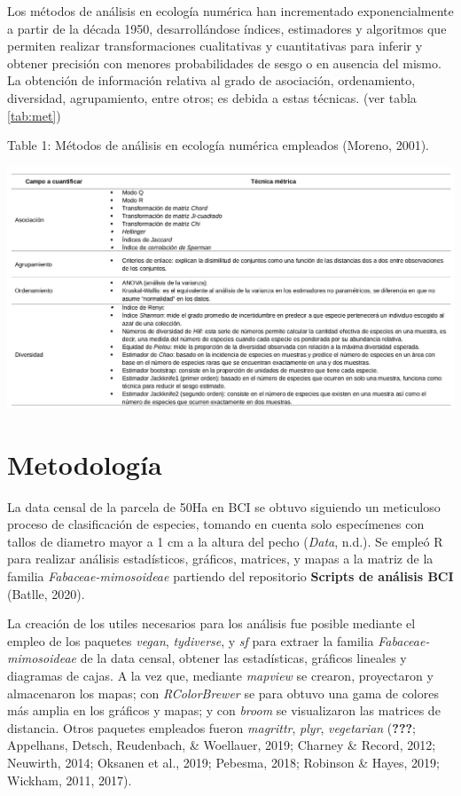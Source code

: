 \documentclass[11pt,]{article}
\begin{document}
Los métodos de análisis en ecología numérica han incrementado
exponencialmente a partir de la década 1950, desarrollándose índices,
estimadores y algoritmos que permiten realizar transformaciones
cualitativas y cuantitativas para inferir y obtener precisión con
menores probabilidades de sesgo o en ausencia del mismo. La obtención de
información relativa al grado de asociación, ordenamiento, diversidad,
agrupamiento, entre otros; es debida a estas técnicas. (ver tabla
\ref {tab:met})

Table 1: Métodos de análisis en ecología numérica empleados (Moreno,
2001).\label{tab:met}

\includegraphics[width=1.00000\textwidth]{Analisis/Diversidad/Tabla_Metodos_Analisis.png}
\textbar{}

\section{Metodología}\label{metodologuxeda}

La data censal de la parcela de 50Ha en BCI se obtuvo siguiendo un
meticuloso proceso de clasificación de especies, tomando en cuenta solo
especímenes con tallos de diametro mayor a 1 cm a la altura del pecho
(\emph{Data}, n.d.). Se empleó R para realizar análisis estadísticos,
gráficos, matrices, y mapas a la matriz de la familia
\emph{Fabaceae-mimosoideae} partiendo del repositorio \textbf{Scripts de
análisis BCI} (Batlle, 2020).

La creación de los utiles necesarios para los análisis fue posible
mediante el empleo de los paquetes \emph{vegan}, \emph{tydiverse}, y
\emph{sf} para extraer la familia \emph{Fabaceae-mimosoideae} de la data
censal, obtener las estadísticas, gráficos lineales y diagramas de
cajas. A la vez que, mediante \emph{mapview} se crearon, proyectaron y
almacenaron los mapas; con \emph{RColorBrewer} se para obtuvo una gama
de colores más amplia en los gráficos y mapas; y con \emph{broom} se
visualizaron las matrices de distancia. Otros paquetes empleados fueron
\emph{magrittr}, \emph{plyr}, \emph{vegetarian} ({\textbf{???}};
Appelhans, Detsch, Reudenbach, \& Woellauer, 2019; Charney \& Record,
2012; Neuwirth, 2014; Oksanen et al., 2019; Pebesma, 2018; Robinson \&
Hayes, 2019; Wickham, 2011, 2017).
\end{document}
